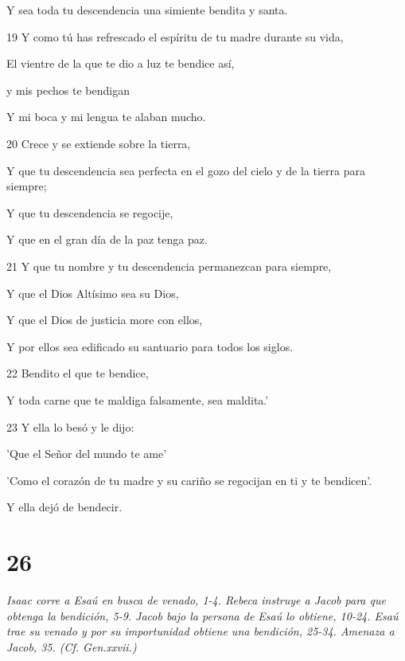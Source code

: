 \par     Y sea toda tu descendencia una simiente bendita y santa.
\par    
\par 19 Y como tú has refrescado el espíritu de tu madre durante su vida,  
\par     El vientre de la que te dio a luz te bendice así,
\par    
\par     [Mi cariño] y mis pechos te bendigan  
\par     Y mi boca y mi lengua te alaban mucho.
\par    
\par 20 Crece y se extiende sobre la tierra,  
\par     Y que tu descendencia sea perfecta en el gozo del cielo y de la tierra para siempre;
\par    
\par     Y que tu descendencia se regocije,  
\par     Y que en el gran día de la paz tenga paz.
\par    
\par 21 Y que tu nombre y tu descendencia permanezcan para siempre,  
\par     Y que el Dios Altísimo sea su Dios,
\par    
\par     Y que el Dios de justicia more con ellos,  
\par     Y por ellos sea edificado su santuario para todos los siglos.
\par    
\par 22 Bendito el que te bendice,  
\par     Y toda carne que te maldiga falsamente, sea maldita.'
\par    
\par 23 Y ella lo besó y le dijo:  
\par     'Que el Señor del mundo te ame'  
\par     'Como el corazón de tu madre y su cariño se regocijan en ti y te bendicen'.
\par     Y ella dejó de bendecir.

\chapter{26}

\textit{Isaac corre a Esaú en busca de venado, 1-4. Rebeca instruye a Jacob para que obtenga la bendición, 5-9. Jacob bajo la persona de Esaú lo obtiene, 10-24. Esaú trae su venado y por su importunidad obtiene una bendición, 25-34. Amenaza a Jacob, 35. (Cf. Gen.xxvii.)}

